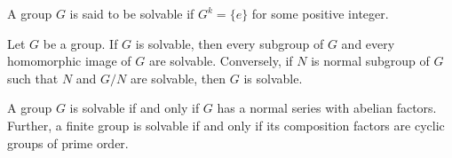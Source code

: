 \begin{defi}
    A group $G$ is said to be solvable if $G^{k}=\{e\}$ for some positive integer.
\end{defi}
\begin{teo}
    Let $G$ be a group. If $G$ is solvable, then every subgroup of $G$ and every homomorphic image of $G$ are solvable. Conversely, if $N$ is normal subgroup of $G$ such that $N$ and $G/N$ are solvable, then $G$ is solvable. 
\end{teo}
\begin{teo}
    A group $G$ is solvable if and only if $G$ has a normal series with abelian factors. Further, a finite group is solvable if and only if its composition factors are cyclic groups of prime order.
\end{teo}